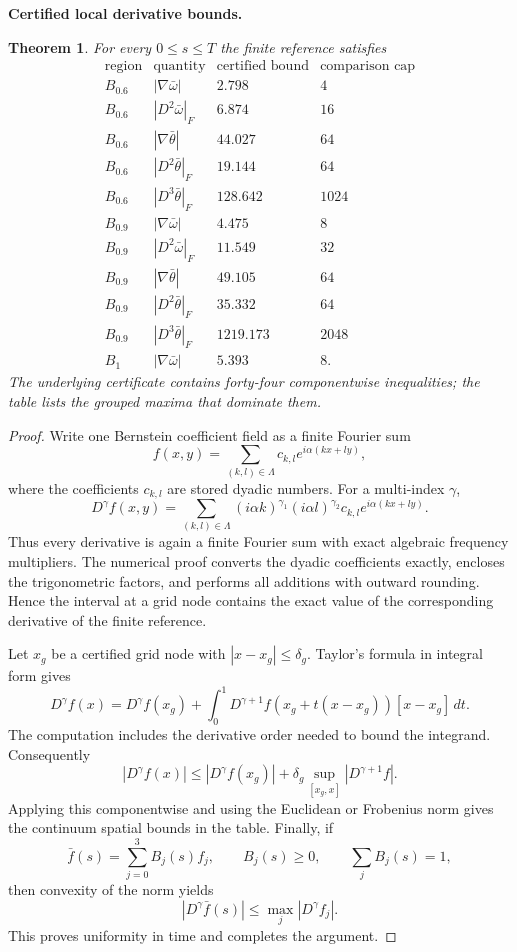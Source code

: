 \documentclass[11pt]{article}
\newtheorem{theorem}{Theorem}[section]\newtheorem{proposition}[theorem]{Proposition}
\theoremstyle{definition}\newtheorem{definition}[theorem]{Definition}\newtheorem{problem}[theorem]{Problem}
\theoremstyle{remark}\newtheorem{remark}[theorem]{Remark}
\begin{document}
\medskip
\noindent\textbf{Certified local derivative bounds.}
\begin{theorem}\label{thm:reference-derivatives}
For every $0\le s\le T$ the finite reference satisfies
\[
\begin{array}{c|c|c|c}
\text{region}&\text{quantity}&\text{certified bound}&\text{comparison cap}\\ \hline
B_{0.6}&|\nabla\bar\omega|&2.798&4\\
B_{0.6}&|D^2\bar\omega|_F&6.874&16\\
B_{0.6}&|\nabla\bar\theta|&44.027&64\\
B_{0.6}&|D^2\bar\theta|_F&19.144&64\\
B_{0.6}&|D^3\bar\theta|_F&128.642&1024\\
B_{0.9}&|\nabla\bar\omega|&4.475&8\\
B_{0.9}&|D^2\bar\omega|_F&11.549&32\\
B_{0.9}&|\nabla\bar\theta|&49.105&64\\
B_{0.9}&|D^2\bar\theta|_F&35.332&64\\
B_{0.9}&|D^3\bar\theta|_F&1219.173&2048\\
B_1&|\nabla\bar\omega|&5.393&8.
\end{array}
\]
The underlying certificate contains forty-four componentwise inequalities; the table lists the grouped maxima that dominate them.
\end{theorem}
\begin{proof}
Write one Bernstein coefficient field as a finite Fourier sum
\[
f(x,y)=\sum_{(k,l)\in\Lambda} c_{k,l}e^{i\alpha(kx+ly)},
\]
where the coefficients $c_{k,l}$ are stored dyadic numbers.  For a multi-index $\gamma$,
\[
D^\gamma f(x,y)=\sum_{(k,l)\in\Lambda}
(i\alpha k)^{\gamma_1}(i\alpha l)^{\gamma_2}c_{k,l}e^{i\alpha(kx+ly)}.
\]
Thus every derivative is again a finite Fourier sum with exact algebraic frequency multipliers.  The numerical proof converts the dyadic coefficients exactly, encloses the trigonometric factors, and performs all additions with outward rounding.  Hence the interval at a grid node contains the exact value of the corresponding derivative of the finite reference.

Let $x_g$ be a certified grid node with $|x-x_g|\le\delta_g$.  Taylor's formula in integral form gives
\[
D^\gamma f(x)=D^\gamma f(x_g)
+\int_0^1D^{\gamma+1}f(x_g+t(x-x_g))[x-x_g]\,dt.
\]
The computation includes the derivative order needed to bound the integrand.  Consequently
\[
|D^\gamma f(x)|
\le |D^\gamma f(x_g)|+\delta_g
\sup_{[x_g,x]}|D^{\gamma+1}f|.
\]
Applying this componentwise and using the Euclidean or Frobenius norm gives the continuum spatial bounds in the table.  Finally, if
\[
\bar f(s)=\sum_{j=0}^3B_j(s)f_j,
\qquad B_j(s)\ge0,\qquad\sum_jB_j(s)=1,
\]
then convexity of the norm yields
\[
|D^\gamma\bar f(s)|\le\max_j|D^\gamma f_j|.
\]
This proves uniformity in time and completes the argument.
\end{proof}
\end{document}
